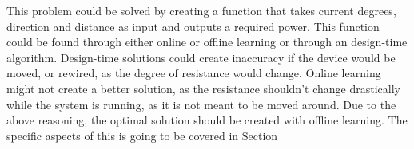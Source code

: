 This problem could be solved by creating a function that takes current degrees, direction and distance as input and outputs a required power.
This function could be found through either online or offline learning or through an design-time algorithm.
Design-time solutions could create inaccuracy if the device would be moved, or rewired, as the degree of resistance would change.
Online learning might not create a better solution, as the resistance shouldn't change drastically while the system is running, as it is not meant to be moved around.
Due to the above reasoning, the optimal solution should be created with offline learning.
The specific aspects of this is going to be covered in Section